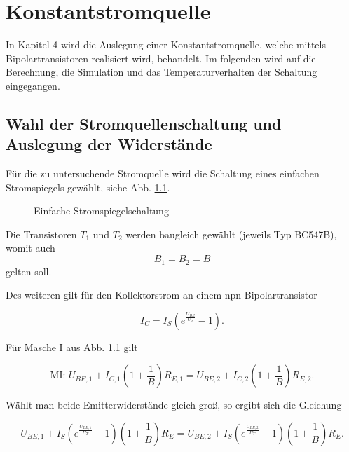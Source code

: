 \def\figpath{tex/4_Konstantstromquelle/pictures}
\graphicspath{{tex/4_Konstantstromquelle/pictures/}}

\chapter{Konstantstromquelle}
In Kapitel 4 wird die Auslegung einer Konstantstromquelle, welche mittels Bipolartransistoren realisiert wird, behandelt. Im folgenden wird auf die Berechnung, die Simulation und das Temperaturverhalten der Schaltung eingegangen. 

\section{Wahl der Stromquellenschaltung und Auslegung der Widerstände}
Für die zu untersuchende Stromquelle wird die Schaltung eines einfachen Stromspiegels gewählt, siehe Abb. \ref{fig_Kap4_01:Stromspiegel01}. 

\begin{figure}[H]
	\centering
	\def\svgwidth{0.5\textwidth}
	
	\caption{Einfache Stromspiegelschaltung} 
	\label{fig_Kap4_01:Stromspiegel01} 
\end{figure}

Die Transistoren $T_1$ und $T_2$ werden baugleich gewählt (jeweils Typ BC547B), womit auch 
\begin{equation}
    B_1 = B_2 = B
\end{equation}
gelten soll. 

Des weiteren gilt für den Kollektorstrom an einem npn-Bipolartransistor

\begin{equation}
    \label{glgn_transist}
    I_C = I_S \left(e^{\frac{U_{BE}}{U_T}} - 1 \right) .
\end{equation}

Für Masche I aus Abb. \ref{fig_Kap4_01:Stromspiegel01} gilt

\begin{equation}
    \text{MI: } U_{BE,1} + I_{C,1}\left( 1 + \frac{1}{B}\right)R_{E,1} = U_{BE,2} + I_{C,2}\left( 1 + \frac{1}{B}\right)R_{E,2} .
\end{equation}

Wählt man beide Emitterwiderstände gleich groß, so ergibt sich die Gleichung

\begin{equation}
    U_{BE,1} + I_S \left(e^{\frac{U_{BE,1}}{U_T}} - 1 \right)\left( 1 + \frac{1}{B}\right)R_E = U_{BE,2} + I_S \left(e^{\frac{U_{BE,2}}{U_T}} - 1 \right)\left( 1 + \frac{1}{B}\right)R_E .
    \label{glng_transzend}
\end{equation}


